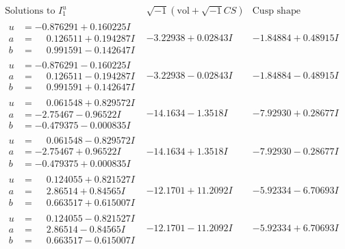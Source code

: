 \documentclass[1p]{elsarticle_modified}
\theoremstyle{definition}
\newcommand{\I}{\sqrt{-1}}
\begin{document}
$$\begin{array}{c|c|c}  
\text{Solutions to }I^u_{1}& \I (\text{vol} + \sqrt{-1}CS) & \text{Cusp shape}\\
 \hline 
\begin{aligned}
u &= -0.876291 + 0.160225 I \\
a &= \phantom{-}0.126511 + 0.194287 I \\
b &= \phantom{-}0.991591 - 0.142647 I\end{aligned}
 & -3.22938 + 0.02843 I & -1.84884 + 0.48915 I \\ \hline\begin{aligned}
u &= -0.876291 - 0.160225 I \\
a &= \phantom{-}0.126511 - 0.194287 I \\
b &= \phantom{-}0.991591 + 0.142647 I\end{aligned}
 & -3.22938 - 0.02843 I & -1.84884 - 0.48915 I \\ \hline\begin{aligned}
u &= \phantom{-}0.061548 + 0.829572 I \\
a &= -2.75467 - 0.96522 I \\
b &= -0.479375 - 0.000835 I\end{aligned}
 & -14.1634 - 1.3518 I & -7.92930 + 0.28677 I \\ \hline\begin{aligned}
u &= \phantom{-}0.061548 - 0.829572 I \\
a &= -2.75467 + 0.96522 I \\
b &= -0.479375 + 0.000835 I\end{aligned}
 & -14.1634 + 1.3518 I & -7.92930 - 0.28677 I \\ \hline\begin{aligned}
u &= \phantom{-}0.124055 + 0.821527 I \\
a &= \phantom{-}2.86514 + 0.84565 I \\
b &= \phantom{-}0.663517 + 0.615007 I\end{aligned}
 & -12.1701 + 11.2092 I & -5.92334 - 6.70693 I \\ \hline\begin{aligned}
u &= \phantom{-}0.124055 - 0.821527 I \\
a &= \phantom{-}2.86514 - 0.84565 I \\
b &= \phantom{-}0.663517 - 0.615007 I\end{aligned}
 & -12.1701 - 11.2092 I & -5.92334 + 6.70693 I \\ \hline\begin{aligned}

\end{aligned}
\end{array}$$
\end{document}

